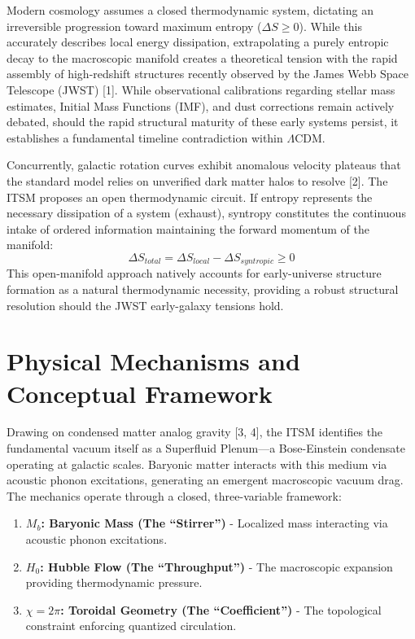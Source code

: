 \documentclass[aps,prd,onecolumn,linenumbers,superscriptaddress,nofootinbib]{revtex4-2}
\begin{document}
Modern cosmology assumes a closed thermodynamic system, dictating an irreversible progression toward maximum entropy ($\Delta S \ge 0$). While this accurately describes local energy dissipation, extrapolating a purely entropic decay to the macroscopic manifold creates a theoretical tension with the rapid assembly of high-redshift structures recently observed by the James Webb Space Telescope (JWST) [1]. While observational calibrations regarding stellar mass estimates, Initial Mass Functions (IMF), and dust corrections remain actively debated, should the rapid structural maturity of these early systems persist, it establishes a fundamental timeline contradiction within $\Lambda$CDM.

Concurrently, galactic rotation curves exhibit anomalous velocity plateaus that the standard model relies on unverified dark matter halos to resolve [2]. The ITSM proposes an open thermodynamic circuit. If entropy represents the necessary dissipation of a system (exhaust), syntropy constitutes the continuous intake of ordered information maintaining the forward momentum of the manifold:
\begin{equation}
\Delta S_{total} = \Delta S_{local} - \Delta S_{syntropic} \ge 0
\end{equation}
This open-manifold approach natively accounts for early-universe structure formation as a natural thermodynamic necessity, providing a robust structural resolution should the JWST early-galaxy tensions hold.

\section{Physical Mechanisms and Conceptual Framework}

Drawing on condensed matter analog gravity [3, 4], the ITSM identifies the fundamental vacuum itself as a Superfluid Plenum—a Bose-Einstein condensate operating at galactic scales. Baryonic matter interacts with this medium via acoustic phonon excitations, generating an emergent macroscopic vacuum drag. The mechanics operate through a closed, three-variable framework:
\begin{enumerate}
    \item \textbf{$M_b$: Baryonic Mass (The ``Stirrer'')} - Localized mass interacting via acoustic phonon excitations.
    \item \textbf{$H_0$: Hubble Flow (The ``Throughput'')} - The macroscopic expansion providing thermodynamic pressure.
    \item \textbf{$\chi = 2\pi$: Toroidal Geometry (The ``Coefficient'')} - The topological constraint enforcing quantized circulation.
\end{enumerate}
\end{document}
